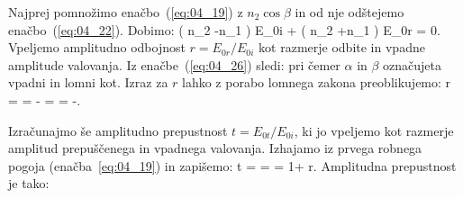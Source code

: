 Najprej pomnožimo enačbo~(\ref{eq:04_19}) z $n_2 \cos \beta$ in od nje odštejemo
enačbo~(\ref{eq:04_22}). Dobimo:
\beq
\left( n_2 \cos \beta-n_1 \cos \alpha\right) E_{0i} + 
\left( n_2 \cos \beta+n_1 \cos \alpha\right) E_{0r} = 0.
\label{eq:04_26}
\eeq
Vpeljemo amplitudno odbojnost $r = E_{0r}/E_{0i}$ 
kot razmerje odbite in vpadne amplitude valovanja. Iz enačbe~(\ref{eq:04_26}) sledi:
pri čemer $\alpha$ in $\beta$ označujeta vpadni in lomni kot. Izraz za $r$
lahko z porabo lomnega zakona preoblikujemo:
\beq
r =  = 
\frac{\frac{\sin \beta}{\sin \alpha} \cos \alpha - \cos \beta}
{\frac{\sin \beta}{\sin \alpha} \cos \alpha - \cos \beta} = \frac{\sin \beta \cos \alpha -
\cos \beta \sin \alpha}{\sin \beta \cos \alpha + \cos \beta \sin \alpha} = 
-\frac{\sin (\alpha -\beta)}{\sin (\alpha + \beta)}.
\label{eq:04_27}
\eeq

Izračunajmo še amplitudno prepustnost $t = E_{0t}/E_{0i}$, ki jo vpeljemo
kot razmerje amplitud prepuščenega in vpadnega valovanja. Izhajamo
iz prvega robnega pogoja (enačba~\ref{eq:04_19}) in zapišemo:
\beq
t =  =  = 1+ r.
\label{eq:04_28}
\eeq
Amplitudna prepustnost je tako:

